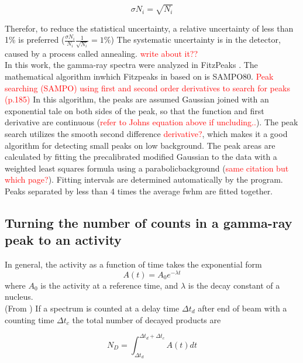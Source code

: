 \begin{equation}
    \sigma N_i = \sqrt{N_i}
\end{equation}

Therefor, to reduce the statistical uncertainty, a relative uncertainty of less than 1\% is preferred ($\frac{\sigma N_i}{N_i}\frac{1}{\sqrt{N_i}}=1\%$) 
The systematic uncertainty is in the detector, caused by a process called annealing. \textcolor{red}{write about it??} \\




\noindent 
In this work, the gamma-ray spectra were analyzed in FitzPeaks \cite{Fitzgerald2009}. The mathematical algorithm inwhich Fitzpeaks in based on is SAMPO80\cite{Koskelo1981}. \textcolor{red}{Peak searching (SAMPO) using first and second order derivatives to search for peaks \cite{Gilmore2008} (p.185)}  In this algorithm, the peaks are assumed Gaussian joined with an exponential tale on both sides of the peak, so that the function and first derivative are continuous (\textcolor{red}{refer to Johns equation above if uncluding..}). The peak search utilizes the smooth second difference \textcolor{red}{derivative?}, which makes it a good algorithm for detecting small peaks on low background\cite{Koskelo1981}. The peak areas are calculated by fitting the precalibrated modified Gaussian to the data with a weighted least squares formula using a parabolicbackground (\textcolor{red}{same citation but which page?}).  Fitting intervals are determined automatically by the program.  Peaks separated by less than 4 times the average fwhm are fitted together.  \\


\subsection{Turning the number of counts in a gamma-ray peak to an activity}
In general, the activity as a function of time takes the exponential form \begin{equation} \label{eq:activity_decaylaw}
    A(t)=A_0 e^{-\lambda t}
\end{equation}
where $A_0$ is the activity at a reference time, and $\lambda$ is the decay constant of a nucleus. \\
\noindent 
(From \cite{Voyles2017c})
If a spectrum is counted at a delay time $\Delta t_d$ after end of beam with a counting time $\Delta t_c$  the total number of decayed products are 

\begin{equation}
    N_D = \int_{\Delta t_d}^{\Delta t_d + \Delta t_c} A(t) dt
\end{equation}

